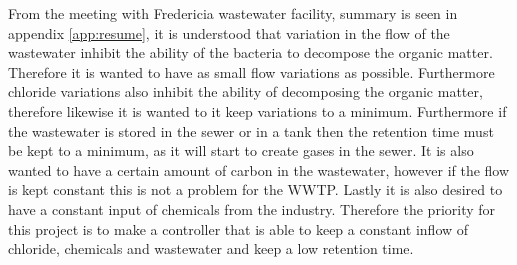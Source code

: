 From the meeting with Fredericia wastewater facility, summary is seen in appendix \ref{app:resume}, it is understood that variation in the flow of the wastewater inhibit the ability of the bacteria to decompose the organic matter. Therefore it is wanted to have as small flow variations as possible. Furthermore chloride variations also inhibit the ability of decomposing the organic matter, therefore likewise it is wanted to it keep variations to a minimum. Furthermore if the wastewater is stored in the sewer or in a tank then the retention time must be kept to a minimum, as it will start to create gases in the sewer. It is also wanted to have a certain amount of carbon in the wastewater, however if the flow is kept constant this is not a problem for the WWTP. Lastly it is also desired to have a constant input of chemicals from the industry. Therefore the priority for this project is to make a controller that is able to keep a constant inflow of chloride, chemicals and wastewater and keep a low retention time.    







